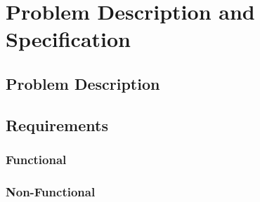 \documentclass[report.tex]{subfiles}
\begin{document}
\chapter{Problem Description and Specification} %
\label{cha:problem_description_and_specification}
\section{Problem Description} %
\label{sec:problem_description}

\section{Requirements} %
\label{sec:requirements}
\subsection{Functional} %
\label{sub:functional}

\subsection{Non-Functional} %
\label{sub:non_functional}

\newpage
\end{document}
